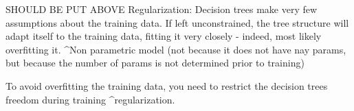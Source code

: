 SHOULD BE PUT ABOVE Regularization:
Decision trees make very few assumptions about the training data.
If left unconstrained,
the tree structure will adapt itself to the training data,
fitting it very closely - indeed, most likely overfitting it.
^Non parametric model
(not because it does not have nay params,
but because the number of params is not determined prior to training)

To avoid overfitting the training data,
you need to restrict the decision trees freedom during training
^regularization.









































































